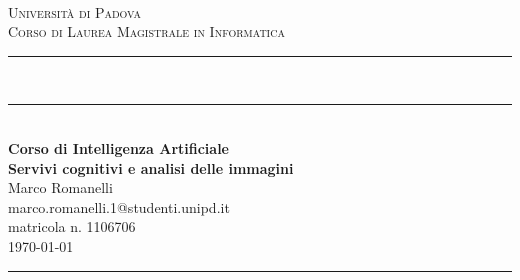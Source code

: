 \documentclass[fleqn,a4paper,11pt]{article}
\newcommand\HRule{\rule{\textwidth}{1pt}}
\newcommand\DRule{\rule{\textwidth}{.4pt}\\[\dimexpr-\baselineskip+1mm+2pt] \rule{\textwidth}{2pt}}
\begin{document}
\begin{titlepage}
\begin{center}
	\begin{minipage}{6in}
  		\centering
  		\hspace*{1.6in}
	\end{minipage}\\[.5cm]
\textsc{\LARGE Universit\`a di Padova}\\[.2cm]
\textsc{\large Corso di Laurea Magistrale in Informatica}\\[.3cm]
\DRule \\[.5cm]
{\Large \bfseries Corso di Intelligenza Artificiale} \\[.4cm]
{\huge \bfseries Servivi cognitivi e analisi delle immagini} \\[.4cm]
{\Large Marco Romanelli} \\[.2cm]
{\footnotesize marco.romanelli.1@studenti.unipd.it} \\
{\footnotesize matricola n. 1106706} \\[1cm]
{\large \today}
\HRule \\[3cm]
\end{center}
\end{titlepage}
\newpage


 

 










%
\end{document}
